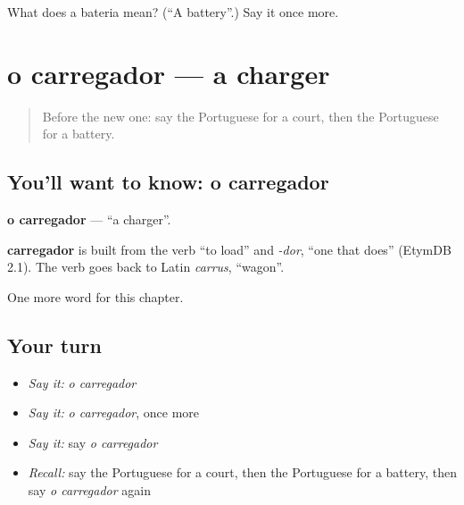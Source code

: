 \begin{tcolorbox}[breakable,colback=teal!4,colframe=teal!35!black,title={Before you move on}]
What does a bateria mean? (\textquotedblleft{}A battery\textquotedblright{}.) Say it once more.
\end{tcolorbox}
\section[o carregador]{o carregador — a charger}

\label{lesson:PT-C159-carregador}



\begin{quote}
Before the new one: say the Portuguese for a court, then the Portuguese for a battery.
\end{quote}

\subsection*{You'll want to know: o carregador}
\textbf{o carregador} — \textquotedblleft{}a charger\textquotedblright{}.

\begin{cousinweb}
\textbf{carregador} is built from the verb \textquotedblleft{}to load\textquotedblright{} and \emph{-dor}, \textquotedblleft{}one that does\textquotedblright{} (EtymDB 2.1). The verb goes back to Latin \emph{carrus}, \textquotedblleft{}wagon\textquotedblright{}.
\end{cousinweb}

\begin{grammarlens}[title={What you've built}]
One more word for this chapter.
\end{grammarlens}

\subsection*{Your turn}
\begin{itemize}
\raggedright
  \item \emph{Say it:} \emph{o carregador}
  \item \emph{Say it:} \emph{o carregador}, once more
  \item \emph{Say it:} say \emph{o carregador}
  \item \emph{Recall:} say the Portuguese for a court, then the Portuguese for a battery, then say \emph{o carregador} again
\end{itemize}

